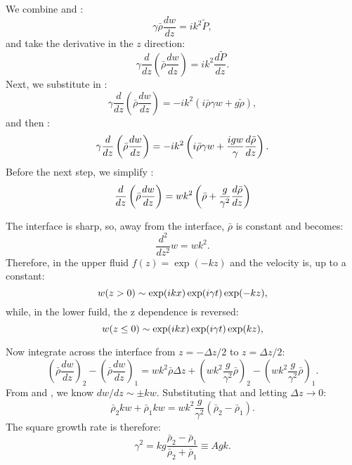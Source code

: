 We combine  and :
\begin{equation}
\gamma \bar\rho \frac{dw}{dz} = i k^2 \tilde{P},
\end{equation}
and take the derivative in the $z$ direction:
\begin{equation}
\gamma \frac{d}{dz} \left(\bar\rho \frac{dw}{dz}\right) = i k^2 \frac{d\tilde{P}}{dz} .
\end{equation}
Next, we substitute in :
\begin{equation}
\gamma \frac{d}{dz} \left(\bar\rho \frac{dw}{dz}\right) = - i k^2 \left(i \bar\rho \gamma w + g \tilde\rho\right) ,
\end{equation}
and then :
\begin{equation} \elabel{foobar}
\gamma \frac{d}{dz} \left(\bar\rho \frac{dw}{dz}\right) = - i k^2 \left(i \bar\rho \gamma w + \frac{i g w}{\gamma} \frac{d \bar\rho}{dz}\right) .
\end{equation}
Before the next step, we simplify :
\begin{equation} \elabel{barfoo}
\frac{d}{dz} \left(\bar\rho \frac{dw}{dz}\right) = w k^2 \left(\bar\rho   + \frac{ g }{\gamma^2} \frac{d \bar\rho}{dz}\right)
\end{equation}

The interface is sharp, so, away from the interface, $\bar\rho$ is constant and  becomes:
\begin{equation}
\frac{d^2}{dz^2}w  = w k^2.
\end{equation}
Therefore, in the upper fluid $f(z) = \exp(-kz)$ and the velocity is, up to a constant:
\begin{equation}\elabel{w1}
w(z>0) \sim \exp(ikx) \exp(i\gamma t) \exp(-kz),
\end{equation}
while, in the lower fuild, the z dependence is reversed:
\begin{equation}\elabel{w2}
w(z\le0) \sim \exp(ikx) \exp(i\gamma t) \exp(kz),
\end{equation}


Now integrate across the interface from $z= -\Delta z/2$ to $z = \Delta z/2$:
\begin{equation}
\left(\bar\rho \frac{dw}{dz}\right)_2 - \left(\bar\rho \frac{dw}{dz}\right)_1 = w k^2 \bar\rho \Delta z  + \left(w k^2 \frac{ g }{\gamma^2}  \bar\rho\right)_2 - \left(w k^2 \frac{ g }{\gamma^2}  \bar\rho\right)_1 .
\end{equation}
From  and , we know $dw/dz \sim \pm kw$.
Substituting that and letting $\Delta z \rightarrow 0$:
\begin{equation}
\bar\rho_2 k w + \bar\rho_1 k w = w k^2 \frac{ g }{\gamma^2}  (\bar\rho_2 - \bar\rho_1).
\end{equation}
The square growth rate is therefore:
\begin{equation}
\gamma^2 = k g \frac{\bar\rho_2 - \bar\rho_1}{\bar\rho_2+\bar\rho_1}  \equiv A g k.
\end{equation}


